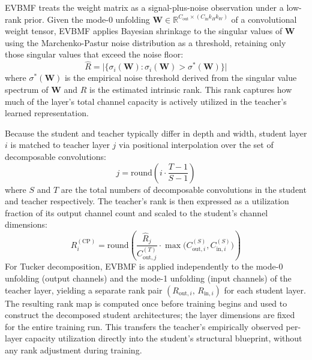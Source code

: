 \documentclass[conference]{IEEEtran}
\begin{document}
\par
EVBMF treats the weight matrix as a signal-plus-noise observation
under a low-rank prior. Given the mode-0 unfolding
$\mathbf{W} \in \mathbb{R}^{C_{\mathrm{out}} \times (C_{\mathrm{in}}
k_H k_W)}$ of a convolutional weight tensor, EVBMF applies
Bayesian shrinkage to the singular values of $\mathbf{W}$ using the
Marchenko-Pastur noise distribution as a threshold, retaining only
those singular values that exceed the noise floor:
\begin{equation}
    \hat{R} = \bigl|\bigl\{ \sigma_i(\mathbf{W}) :
    \sigma_i(\mathbf{W}) > \sigma^*(\mathbf{W}) \bigr\}\bigr|
\end{equation}
where $\sigma^*(\mathbf{W})$ is the empirical noise threshold
derived from the singular value spectrum of $\mathbf{W}$ and
$\hat{R}$ is the estimated intrinsic rank. This rank captures how
much of the layer's total channel capacity is actively utilized in
the teacher's learned representation.

\par
Because the student and teacher typically differ in depth and width,
student layer $i$ is matched to teacher layer $j$ via positional
interpolation over the set of decomposable convolutions:
\begin{equation}
    j = \mathrm{round}\!\left( i \cdot \frac{T - 1}{S - 1} \right)
    \label{eq:interpolation}
\end{equation}
where $S$ and $T$ are the total numbers of decomposable convolutions
in the student and teacher respectively. The teacher's rank is then
expressed as a utilization fraction of its output channel count and
scaled to the student's channel dimensions:
\begin{equation}
    R_i^{(\mathrm{CP})} = \mathrm{round}\!\left(
        \frac{\hat{R}_j}{C_{\mathrm{out},j}^{(T)}}
        \cdot \max\!\bigl(C_{\mathrm{out},i}^{(S)},
                          C_{\mathrm{in},i}^{(S)}\bigr)
    \right)
\end{equation}
For Tucker decomposition, EVBMF is applied independently to the
mode-0 unfolding (output channels) and the mode-1 unfolding (input
channels) of the teacher layer, yielding a separate rank pair
$(R_{\mathrm{out},i},\, R_{\mathrm{in},i})$ for each student layer.
The resulting rank map is computed once before training begins and
used to construct the decomposed student architectures; the layer
dimensions are fixed for the entire training run. This transfers
the teacher's empirically observed per-layer capacity utilization
directly into the student's structural blueprint, without any
rank adjustment during training.
\end{document}
